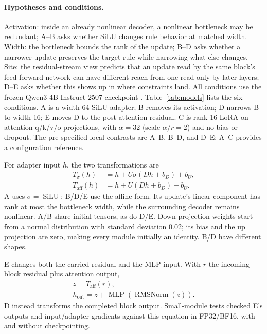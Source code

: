 \paragraph{Hypotheses and conditions.}
Activation: inside an already nonlinear decoder, a nonlinear bottleneck may be redundant; A--B asks whether SiLU changes rule behavior at matched width. Width: the bottleneck bounds the rank of the update; B--D asks whether a narrower update preserves the target rule while narrowing what else changes. Site: the residual-stream view predicts that an update read by the same block's feed-forward network can have different reach from one read only by later layers; D--E asks whether this shows up in where constraints land.
All conditions use the frozen Qwen3-4B-Instruct-2507 checkpoint \citep{qwenmodel}. Table~\ref{tab:models} lists the six conditions. A is a width-64 SiLU adapter; B removes its activation; D narrows B to width 16; E moves D to the post-attention residual. C is rank-16 LoRA \citep{hu2022} on attention q/k/v/o projections, with $\alpha=32$ (scale $\alpha/r=2$) and no bias or dropout. The pre-specified local contrasts are A--B, B--D, and D--E; A--C provides a configuration reference.

\ModelTable

For adapter input $h$, the two transformations are
\begin{align}
T_{\sigma}(h)&=h+U\sigma(Dh+b_D)+b_U,\\
T_{\mathrm{aff}}(h)&=h+U(Dh+b_D)+b_U.
\end{align}
A uses $\sigma=\operatorname{SiLU}$; B/D/E use the affine form. Its update's linear component has rank at most the bottleneck width, while the surrounding decoder remains nonlinear. A/B share initial tensors, as do D/E. Down-projection weights start from a normal distribution with standard deviation 0.02; its bias and the up projection are zero, making every module initially an identity. B/D have different shapes.

E changes both the carried residual and the MLP input. With $r$ the incoming block residual plus attention output,
\begin{equation}
\begin{gathered}
z=T_{\mathrm{aff}}(r),\\
h_{\mathrm{out}}=z+\operatorname{MLP}(\operatorname{RMSNorm}(z)).
\end{gathered}
\end{equation}
D instead transforms the completed block output. Small-module tests checked E's outputs and input/adapter gradients against this equation in FP32/BF16, with and without checkpointing.

